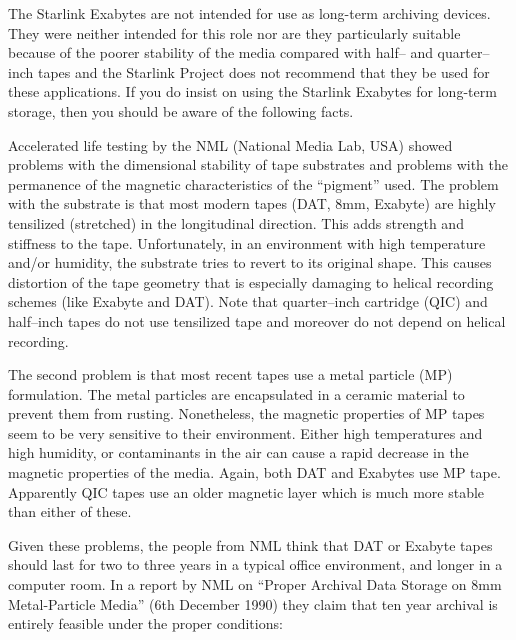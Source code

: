 The Starlink Exabytes are not intended for use as long-term archiving devices.
They were neither intended for this role nor are they particularly suitable
because of the poorer stability of the media compared with half-- and
quarter--inch tapes and the Starlink Project does not recommend that they be
used for these applications. If you do insist on using the Starlink Exabytes
for long-term storage, then you should be aware of the following facts.

Accelerated life testing by the NML (National Media Lab, USA) showed problems
with the dimensional stability of tape substrates and problems with the
permanence of the magnetic characteristics of the ``pigment'' used.  The
problem with the substrate is that most modern tapes (DAT, 8mm, Exabyte) are
highly tensilized (stretched) in the longitudinal direction.  This adds
strength and stiffness to the tape.  Unfortunately, in an environment with high
temperature and/or humidity, the substrate tries to revert to its original
shape.  This causes distortion of the tape geometry that is especially damaging
to helical recording schemes (like Exabyte and DAT). Note that quarter--inch
cartridge (QIC) and half--inch tapes do not use tensilized tape and moreover
do not depend on helical recording.

The second problem is that most recent tapes use a metal particle (MP)
formulation. The metal particles are encapsulated in a ceramic material to
prevent them from rusting.  Nonetheless, the magnetic properties of MP tapes
seem to be very sensitive to their environment.  Either high temperatures and
high humidity, or contaminants in the air can cause a rapid decrease in the
magnetic properties of the media.  Again, both DAT and Exabytes use MP tape.
Apparently QIC tapes use an older magnetic layer which is much more stable than
either of these.

Given these problems, the people from NML think that DAT or Exabyte tapes
should last for two to three years in a typical office environment, and longer
in a computer room.   In a report by NML on ``Proper Archival Data Storage on
8mm Metal-Particle Media'' (6th December 1990) they claim that
ten year archival is entirely feasible under the proper conditions:

